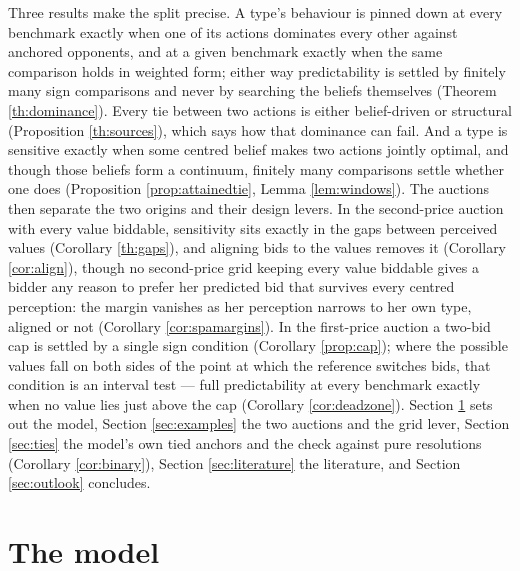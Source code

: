 \documentclass[12pt]{article}
\theoremstyle{definition}
\begin{document}
Three results make the split precise. A type's behaviour is pinned down at every benchmark exactly when one of its actions dominates every other against anchored opponents, and at a given benchmark exactly when the same comparison holds in weighted form; either way predictability is settled by finitely many sign comparisons and never by searching the beliefs themselves (Theorem \ref{th:dominance}). Every tie between two actions is either belief-driven or structural (Proposition \ref{th:sources}), which says how that dominance can fail. And a type is sensitive exactly when some centred belief makes two actions jointly optimal, and though those beliefs form a continuum, finitely many comparisons settle whether one does (Proposition \ref{prop:attainedtie}, Lemma \ref{lem:windows}). The auctions then separate the two origins and their design levers. In the second-price auction with every value biddable, sensitivity sits exactly in the gaps between perceived values (Corollary \ref{th:gaps}), and aligning bids to the values removes it (Corollary \ref{cor:align}), though no second-price grid keeping every value biddable gives a bidder any reason to prefer her predicted bid that survives every centred perception: the margin vanishes as her perception narrows to her own type, aligned or not (Corollary \ref{cor:spamargins}). In the first-price auction a two-bid cap is settled by a single sign condition (Corollary \ref{prop:cap}); where the possible values fall on both sides of the point at which the reference switches bids, that condition is an interval test --- full predictability at every benchmark exactly when no value lies just above the cap (Corollary \ref{cor:deadzone}). Section \ref{sec:model} sets out the model, Section \ref{sec:examples} the two auctions and the grid lever, Section \ref{sec:ties} the model's own tied anchors and the check against pure resolutions (Corollary \ref{cor:binary}), Section \ref{sec:literature} the literature, and Section \ref{sec:outlook} concludes.

\section{The model}\label{sec:model}

\end{document}
